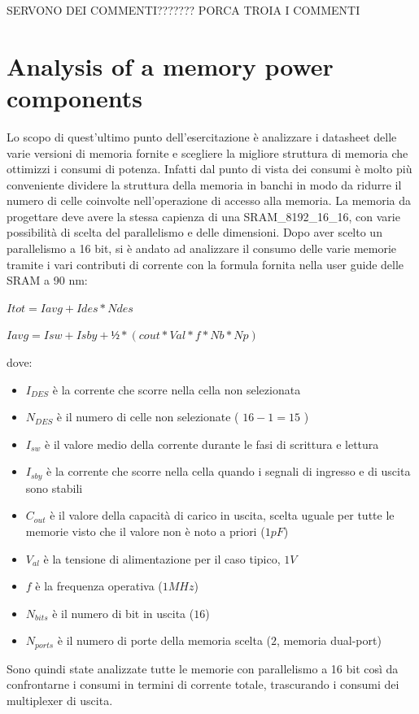 SERVONO DEI COMMENTI??????? PORCA TROIA I COMMENTI

\section{Analysis of a memory power components}
Lo scopo di quest’ultimo punto dell’esercitazione è  analizzare i datasheet delle varie versioni di memoria fornite e scegliere la migliore struttura di memoria che ottimizzi i consumi di potenza. Infatti dal punto di vista dei consumi è molto più conveniente dividere la struttura della memoria in banchi in modo da ridurre il numero di celle coinvolte nell’operazione di accesso alla memoria. 
La memoria da progettare deve avere la stessa capienza di una SRAM\_8192\_16\_16, con varie possibilità di scelta del parallelismo e delle dimensioni.
Dopo aver scelto un parallelismo a 16 bit, si è andato ad analizzare il consumo delle varie memorie tramite i vari contributi di corrente con la formula fornita nella user guide delle SRAM a 90 nm:
\begin{center}
$Itot= Iavg+Ides*Ndes$
\end{center}
\begin{center}
	$Iavg=Isw+Isby+½*(cout*Val*f*Nb*Np)$
\end{center}
dove:
\begin{itemize}
\item $I_{DES}$ è la corrente che scorre nella cella non selezionata
\item $N_{DES}$ è il numero di celle non selezionate ( $16-1=15$ )
\item $I_{sw}$ è il valore medio della corrente durante le fasi di scrittura e lettura
\item $I_{sby}$ è la corrente che scorre nella cella quando i segnali di ingresso e di uscita sono stabili
\item $C_{out}$ è il valore della capacità di carico in uscita, scelta uguale per tutte le memorie visto che il valore non è noto a priori ($1pF$)
\item $V_{al}$ è la tensione di alimentazione per il caso tipico, $1V$
\item $f$ è la frequenza operativa ($1MHz$)
\item $N_{bits}$ è il numero di bit in uscita ($16$)
\item $N_{ports}$ è il numero di porte della memoria scelta ($2$, memoria dual-port)
\end{itemize}
Sono quindi state analizzate tutte le memorie con parallelismo a 16 bit così da confrontarne i consumi in termini di corrente totale, trascurando i consumi dei multiplexer di uscita.
